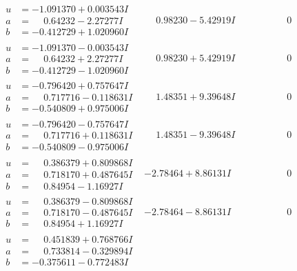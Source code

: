 \documentclass[1p]{elsarticle_modified}
\theoremstyle{definition}
\begin{document}
$$\begin{array}{c|c|c}
\begin{aligned}
u &= -1.091370 + 0.003543 I \\
a &= \phantom{-}0.64232 - 2.27277 I \\
b &= -0.412729 + 1.020960 I\end{aligned}
 & \phantom{-}0.98230 - 5.42919 I & \phantom{-0.000000 } 0 \\ \hline\begin{aligned}
u &= -1.091370 - 0.003543 I \\
a &= \phantom{-}0.64232 + 2.27277 I \\
b &= -0.412729 - 1.020960 I\end{aligned}
 & \phantom{-}0.98230 + 5.42919 I & \phantom{-0.000000 } 0 \\ \hline\begin{aligned}
u &= -0.796420 + 0.757647 I \\
a &= \phantom{-}0.717716 - 0.118631 I \\
b &= -0.540809 + 0.975006 I\end{aligned}
 & \phantom{-}1.48351 + 9.39648 I & \phantom{-0.000000 } 0 \\ \hline\begin{aligned}
u &= -0.796420 - 0.757647 I \\
a &= \phantom{-}0.717716 + 0.118631 I \\
b &= -0.540809 - 0.975006 I\end{aligned}
 & \phantom{-}1.48351 - 9.39648 I & \phantom{-0.000000 } 0 \\ \hline\begin{aligned}
u &= \phantom{-}0.386379 + 0.809868 I \\
a &= \phantom{-}0.718170 + 0.487645 I \\
b &= \phantom{-}0.84954 - 1.16927 I\end{aligned}
 & -2.78464 + 8.86131 I & \phantom{-0.000000 } 0 \\ \hline\begin{aligned}
u &= \phantom{-}0.386379 - 0.809868 I \\
a &= \phantom{-}0.718170 - 0.487645 I \\
b &= \phantom{-}0.84954 + 1.16927 I\end{aligned}
 & -2.78464 - 8.86131 I & \phantom{-0.000000 } 0 \\ \hline\begin{aligned}
u &= \phantom{-}0.451839 + 0.768766 I \\
a &= \phantom{-}0.733814 - 0.329894 I \\
b &= -0.375611 - 0.772483 I\end{aligned}

\end{array}$$
\end{document}
